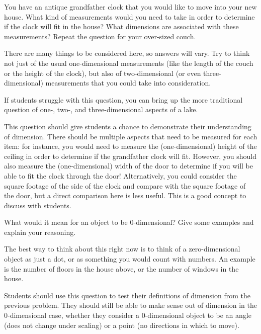 \documentclass{ximera}
\begin{document}
\begin{problem}
You have an antique grandfather clock that you would like to move into your new house.  What kind of measurements would you need to take in order to determine if the clock will fit in the house?  What dimensions are associated with these measurements?  Repeat the question for your over-sized couch.

\begin{solution}
There are many things to be considered here, so answers will vary.  Try to think not just of the usual one-dimensional measurements (like the length of the couch or the height of the clock), but also of two-dimensional (or even three-dimensional) measurements that you could take into consideration.

If students struggle with this question, you can bring up the more traditional question of one-, two-, and three-dimensional aspects of a lake.
\end{solution}

\begin{instructorNotes}
This question should give students a chance to demonstrate their understanding of dimension.  There should be multiple aspects that need to be measured for each item: for instance, you would need to measure the (one-dimensional) height of the ceiling in order to determine if the grandfather clock will fit.  However, you should also measure the (one-dimensional) width of the door to determine if you will be able to fit the clock through the door!  Alternatively, you could consider the square footage of the side of the clock and compare with the square footage of the door, but a direct comparison here is less useful.  This is a good concept to discuss with students.
\end{instructorNotes}
\end{problem}

\begin{problem}
    What would it mean for an object to be 0-dimensional?  Give some examples and explain your reasoning.
    
    \begin{solution}
        The best way to think about this right now is to think of a zero-dimensional object as just a dot, or as something you would count with numbers.  An example is the number of floors in the house above, or the number of windows in the house.
    \end{solution}
    
    \begin{instructorNotes}
        Students should use this question to test their definitions of dimension from the previous problem.  They should still be able to make sense out of dimension in the 0-dimensional case, whether they consider a 0-dimensional object to be an angle (does not change under scaling) or a point (no directions in which to move).
    \end{instructorNotes}
\end{problem}
\end{document}
